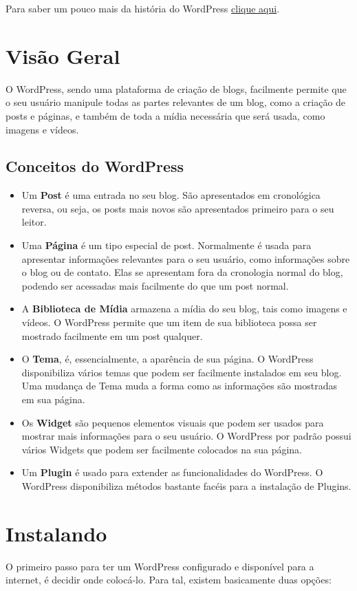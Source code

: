 \documentclass[12pt,onecolumn]{article}
\begin{document}
	Para saber um pouco mais da história do WordPress  \href{http://wordpress.org/about/}{clique aqui}.
          
\section{Visão Geral}
	O WordPress, sendo uma plataforma de criação de blogs, facilmente permite que o seu usuário manipule 
	todas as partes relevantes de um blog, como a criação de posts e páginas, e também de toda a mídia 
	necessária que será usada, como imagens e vídeos.

	\subsection{Conceitos do WordPress}
	\begin{itemize}
		\item Um \textbf{Post} é uma entrada no seu blog. São apresentados em cronológica reversa, 
		ou seja, os posts mais novos são apresentados primeiro para o seu leitor.  
		\item Uma \textbf{Página} é um tipo especial de post. Normalmente é usada para apresentar 
		informações relevantes para o seu usuário, como informações sobre o blog ou de contato. 
		Elas se apresentam fora da cronologia normal do blog, podendo ser acessadas mais facilmente 
		do que um post normal.
		\item A \textbf{Biblioteca de Mídia} armazena a mídia do seu blog, tais como imagens e vídeos.
		O WordPress permite que um item de sua biblioteca possa ser mostrado facilmente em um post
		qualquer.
		\item O \textbf{Tema}, é, essencialmente, a aparência de sua página. O WordPress disponibiliza 
		vários temas que podem ser facilmente instalados em seu blog. Uma mudança de Tema muda a
		forma como as informações são mostradas em sua página.
		\item Os \textbf{Widget} são pequenos elementos visuais que podem ser usados para mostrar 
		mais informações para o seu usuário. O WordPress por padrão possui vários Widgets que podem 
		ser facilmente colocados na sua página.
		\item Um \textbf{Plugin} é usado para extender as funcionalidades do WordPress. O WordPress
		disponibiliza métodos bastante facéis para a instalação de Plugins.
	\end{itemize}

\section{Instalando}
	O primeiro passo para ter um WordPress configurado e disponível para a internet, é decidir onde colocá-lo.
	Para tal, existem basicamente duas opções:
\end{document}
